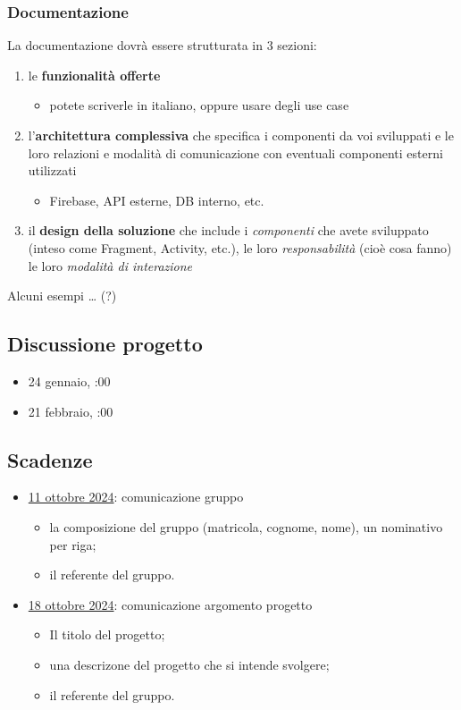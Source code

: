 \subsubsection{Documentazione}
\par La documentazione dovrà essere strutturata in 3 sezioni:
\begin{enumerate}
    \item le \textbf{funzionalità offerte}
    \begin{itemize}
        \item potete scriverle in italiano, oppure usare degli use case
    \end{itemize}
    \item l'\textbf{architettura complessiva} che specifica i componenti da voi sviluppati e le loro relazioni e modalità di comunicazione con eventuali componenti esterni utilizzati
    \begin{itemize}
        \item Firebase, API esterne, DB interno, etc.
    \end{itemize}
    \item il \textbf{design della soluzione} che include i \textit{componenti} che avete sviluppato (inteso come Fragment, Activity, etc.), le loro \textit{responsabilità} (cioè cosa fanno) le loro \textit{modalità di interazione}
\end{enumerate}
\par Alcuni esempi … (?)

\subsection{Discussione progetto}
\begin{itemize}
    \item 24 gennaio, :00
    \item 21 febbraio, :00
\end{itemize}

\subsection{Scadenze}
\begin{itemize}
    \item \underline{11 ottobre 2024}: comunicazione gruppo
    \begin{itemize}
        \item la composizione del gruppo (matricola, cognome, nome), un nominativo per riga;
        \item il referente del gruppo.
    \end{itemize}
    \item \underline{18 ottobre 2024}: comunicazione argomento progetto
    \begin{itemize}
        \item Il titolo del progetto;
        \item una descrizone del progetto che si intende svolgere;
        \item il referente del gruppo.
    \end{itemize}
\end{itemize}

